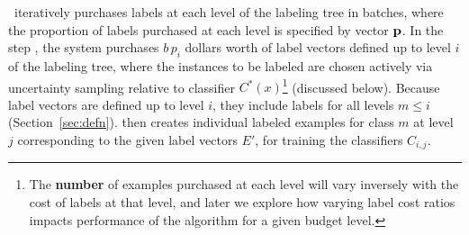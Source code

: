 \documentclass[10pt,conference,compsocconf]{IEEEtran}
\newcommand{\sys}{\Call{Hal}{}} %
\begin{document}
\sys\ iteratively purchases labels at each level of the labeling tree in batches,
where the proportion of labels purchased at each level is specified by
vector ${\bf p}$.  
In the step ,
the system purchases $b \, p_i$ dollars worth of label vectors
defined up to level $i$ of the labeling tree, where the instances to be labeled are
chosen actively via uncertainty sampling relative to classifier $C^*(x)$\footnote{The {
\bf number} of examples purchased at each level will vary inversely with the cost of labels
at that level, and later we explore how varying label cost ratios impacts performance of the algorithm
for a given budget level.
} (discussed below).
Because label vectors are defined up to level $i$, they include
labels for all levels $m \le i$ (Section~\ref{sec:defn}).
 then creates individual labeled examples for
class $m$ at level $j$
corresponding to the given label vectors $E'$, for training the classifiers $C_{i, j}$.




\end{document}
